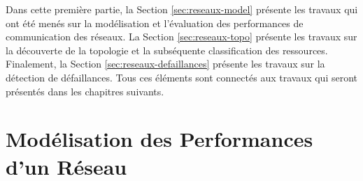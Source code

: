 \begin{resume}
Dans cette première partie, la Section \ref{sec:reseaux-model} présente les travaux qui ont été menés sur la modélisation et l'évaluation des performances de communication des réseaux. La Section \ref{sec:reseaux-topo} présente les travaux sur la découverte de la topologie et la subséquente classification des ressources. Finalement, la Section \ref{sec:reseaux-defaillances} présente les travaux sur la détection de défaillances. Tous ces éléments sont connectés aux travaux qui seront présentés dans les chapitres suivants.  
%
%
%
%

\end{resume}

\section{Modélisation des Performances d'un Réseau\label{sec:reseaux-model}}


